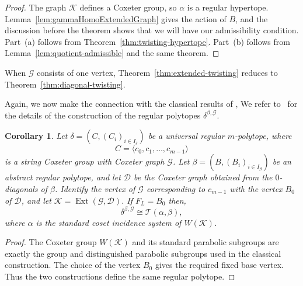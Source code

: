 \documentclass[11pt,letterpaper]{amsart}
\newtheorem{coro}[prop]{Corollary}
\newcommand{\GG}{\mathcal{G}}
\newcommand{\KK}{\mathcal{K}}
\newcommand{\TT}{\mathcal{T}}
\newcommand{\EXT}{\operatorname{Ext}}
\begin{document}
\begin{proof}
The graph $\KK$ defines a Coxeter group, so $\alpha$ is a regular hypertope. Lemma~\ref{lem:gammaHomoExtendedGraph} gives the action of $B$, and the discussion before the theorem shows that we will have our admissibility condition. Part~(a) follows from Theorem~\ref{thm:twisting-hypertope}. Part~(b) follows from Lemma~\ref{lem:quotient-admissible} and the same theorem.
\end{proof}


When $\GG$ consists of one vertex, Theorem~\ref{thm:extended-twisting} reduces to Theorem~\ref{thm:diagonal-twisting}.

Again, we now make the connection with the classical results of \cite{ARP}, We refer to~\cite[Section~8B]{ARP} for the details of the construction of the regular polytopes $\delta^{\beta,\GG}$.

\begin{coro}\label{coro:classical-general-twisting}
Let $\delta=(C,(C_i)_{i\in I_\delta})$ be a universal regular $m$-polytope, where
\[
C=\langle c_0,c_1,\ldots,c_{m-1}\rangle
\]
is a string Coxeter group with Coxeter graph $\GG$. Let $\beta=(B,(B_i)_{i\in I_\beta})$ be an abstract regular polytope, and let $\mathcal{D}$ be the Coxeter graph obtained from the $0$-diagonals of $\beta$. Identify the vertex of $\GG$ corresponding to $c_{m-1}$ with the vertex $B_0$ of $\mathcal{D}$, and let $\KK=\EXT(\GG,\mathcal{D})$. If $F_L = B_0$ then,
\[
\delta^{\beta,\GG}\cong\TT(\alpha,\beta),
\]
where $\alpha$ is the standard coset incidence system of $W(\KK)$.
\end{coro}

\begin{proof}
The Coxeter group $W(\KK)$ and its standard parabolic subgroups are exactly the group and distinguished parabolic subgroups used in the classical construction. The choice of the vertex $B_0$ gives the required fixed base vertex. Thus the two constructions define the same regular polytope.
\end{proof}
\end{document}
